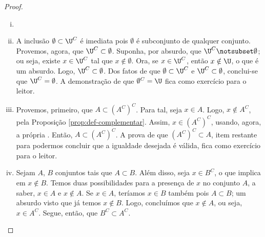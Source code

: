 \begin{proof}
\begin{enumerate}[i)]
\item[]
\item
A inclusão $\emptyset \subset \U^C$ é imediata pois $\emptyset$ é subconjunto de qualquer conjunto. 
Provemos, agora, que $\U^C \subset \emptyset$.
Suponha, por absurdo, que $\U^C \notsubset \emptyset$; ou seja, existe $x \in \U^C$ tal que $x \notin \emptyset$.
Ora, se $x \in \U^C$, então $x \notin \U$, o que é um absurdo.
Logo, $\U^C \subset \emptyset$.
Dos fatos de que $\emptyset \subset \U^C$ e $\U^C \subset \emptyset$, conclui-se que $\U^C = \emptyset$.
A demonstração de que $\emptyset^C = \U$ fica como exercício para o leitor.

\item
Provemos, primeiro, que $A \subset (A^C)^C$.
Para tal, seja $x \in A$.
Logo, $x \notin A^C$, pela Proposição \ref{prop:def-complementar}.
Assim, $x \in (A^C)^C$, usando, agora, a própria .
Então, $A \subset (A^C)^C$.
A prova de que $(A^C)^C \subset A$, item restante para podermos concluir que a igualdade desejada é válida, fica como exercício para o leitor.

\item
Sejam $A$, $B$ conjuntos tais que $A \subset B$.
Além disso, seja $x \in B^C$, o que implica em $x \notin B$.
Temos duas possibilidades para a presença de $x$ no conjunto $A$, a saber, $x \in A$ e $x \notin A$.
Se $x \in A$, teríamos $x \in B$ também pois $A \subset B$; um absurdo visto que já temos $x \notin B$.
Logo, concluímos que $x \notin A$, ou seja, $x \in A^C$.
Segue, então, que $B^C \subset A^C$.
\end{enumerate}
\end{proof}


